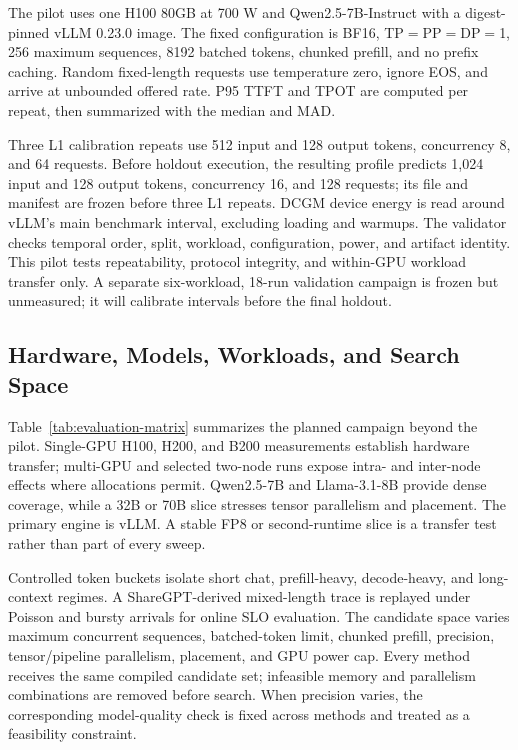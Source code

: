 The pilot uses one H100 80GB at 700 W and Qwen2.5-7B-Instruct with a
digest-pinned vLLM 0.23.0 image.  The fixed configuration is BF16,
TP$=$PP$=$DP$=$1, 256 maximum sequences, 8192 batched tokens, chunked prefill,
and no prefix caching.  Random fixed-length requests use temperature zero,
ignore EOS, and arrive at unbounded offered rate.  P95 TTFT and TPOT are
computed per repeat, then summarized with the median and MAD.

Three L1 calibration repeats use 512 input and 128 output tokens, concurrency
8, and 64 requests.  Before holdout execution, the resulting profile predicts
1,024 input and 128 output tokens, concurrency 16, and 128 requests; its file
and manifest are frozen before three L1 repeats.  DCGM device energy is read
around vLLM's main benchmark interval, excluding loading and warmups.  The
validator checks temporal order, split, workload, configuration, power, and
artifact identity.  This pilot tests repeatability, protocol integrity, and
within-GPU workload transfer only.  A separate six-workload, 18-run validation
campaign is frozen but unmeasured; it will calibrate intervals before the final
holdout.

\subsection{Hardware, Models, Workloads, and Search Space}

Table~\ref{tab:evaluation-matrix} summarizes the planned campaign beyond the
pilot.  Single-GPU H100, H200, and B200 measurements establish hardware
transfer; multi-GPU and selected two-node runs expose intra- and inter-node
effects where allocations permit.  Qwen2.5-7B and Llama-3.1-8B provide dense
coverage, while a 32B or 70B slice stresses tensor parallelism and placement.
The primary engine is vLLM.  A stable FP8 or second-runtime slice is a transfer
test rather than part of every sweep.



Controlled token buckets isolate short chat, prefill-heavy, decode-heavy, and
long-context regimes.  A ShareGPT-derived mixed-length trace is replayed under
Poisson and bursty arrivals for online SLO evaluation.  The candidate space
varies maximum concurrent sequences, batched-token limit, chunked prefill,
precision, tensor/pipeline parallelism, placement, and GPU power cap.  Every
method receives the same compiled candidate set; infeasible memory and
parallelism combinations are removed before search.  When precision varies,
the corresponding model-quality check is fixed across methods and treated as a
feasibility constraint.

